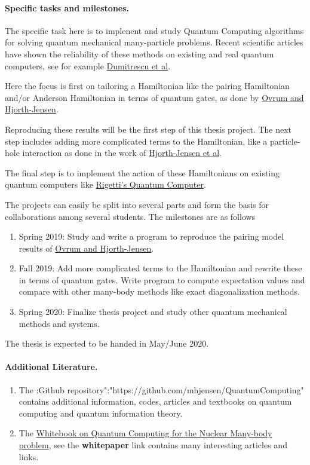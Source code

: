 \documentclass[%
oneside,                 %
final,                   %
10pt]{article}
\begin{document}
\paragraph{Specific tasks and milestones.}
The specific task here is to implenent and study Quantum Computing algorithms 
for solving quantum mechanical many-particle
problems. 
Recent scientific articles have shown the reliability of these methods on existing and real quantum computers, see for example 
\href{{https://arxiv.org/abs/1801.03897}}{Dumitrescu et al}.

Here the focus is first on tailoring a Hamiltonian like the pairing Hamiltonian and/or Anderson Hamiltonian in terms of quantum gates, as done by \href{{https://arxiv.org/abs/0705.1928}}{Ovrum and Hjorth-Jensen}.

Reproducing these results will be the first step of this thesis project. The next step includes adding more complicated terms to the Hamiltonian, like a particle-hole interaction as done in the work of \href{{http://iopscience.iop.org/article/10.1088/0954-3899/37/6/064035/meta}}{Hjorth-Jensen et al}.

The final step is to implement the action of these Hamiltonians on existing quantum computers like \href{{https://www.rigetti.com/}}{Rigetti's Quantum Computer}. 

The projects can easily be split into several parts and form the basis for collaborations among several students. The milestones are as follows
\begin{enumerate}
\item Spring 2019: Study and write a program to reproduce the pairing model results of \href{{https://arxiv.org/abs/0705.1928}}{Ovrum and Hjorth-Jensen}.

\item Fall 2019: Add more complicated terms to the Hamiltonian and rewrite these in terms of quantum gates. Write program to compute expectation values and compare with other many-body methods like exact diagonalization methods. 

\item Spring 2020: Finalize thesis project and study other quantum mechanical methods and systems.
\end{enumerate}

\noindent
The thesis is expected to be handed in May/June 2020.

\paragraph{Additional Literature.}
\begin{enumerate}
\item The :Github repository":"https://github.com/mhjensen/QuantumComputing" contains additional information, codes, articles and textbooks on quantum computing and quantum information theory.

\item The \href{{http://www.int.washington.edu/PROGRAMS/17-66W/}}{Whitebook on Quantum Computing for the Nuclear Many-body problem}, see the \textbf{whitepaper} link contains many interesting articles and links. 
\end{enumerate}

\noindent

\end{document}
